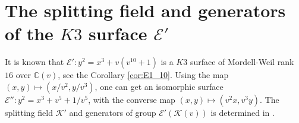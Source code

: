 \documentclass[11pt]{amsart}
\newcommand{\CC}{{\mathbb C}}
\newcommand{\Ee}{{\mathcal E}}
\newcommand{\KK}{{\mathcal K}}
\numberwithin{equation}{section}
\numberwithin{table}{section}
\newcommand\<{\langle}
\begin{document}
\section{The  splitting field and generators of the  $K3$ surface $\Ee'$}
\label{K3}

It is known that $\Ee': y^2=x^3+ v (v^{10}+1)$ is a $K3$ surface of Mordell-Weil rank $16$ over $\CC(v)$, see the Corollary \ref{cor:E1_10}.
Using the map  $(x, y) \mapsto (x/v^2, y/v^3)$,   one can get an isomorphic surface 
$\Ee'': y^2 =x^3 + v^5 + 1/v^5$, with  the converse map $(x,y) \mapsto (v^2 x, v^3 y)$.
The   splitting field  $\KK'$  and generators of  group $\Ee'(\KK(v))$ is determined  
in \cite[Theorem 1.4]{salami2022generators}.
 
\end{document}
